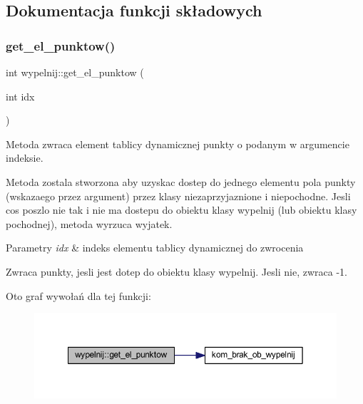 \subsection{Dokumentacja funkcji składowych}
\mbox{\label{classwypelnij_aa30d2e93f672e9f4b35c842f52040019}} 
\subsubsection{\texorpdfstring{get\+\_\+el\+\_\+punktow()}{get\_el\_punktow()}}
{\footnotesize\ttfamily int wypelnij\+::get\+\_\+el\+\_\+punktow (\begin{DoxyParamCaption}\item[{int}]{idx }\end{DoxyParamCaption})}

Metoda zwraca element tablicy dynamicznej punkty o podanym w argumencie indeksie.

Metoda zostala stworzona aby uzyskac dostep do jednego elementu pola punkty (wskazaego przez argument) przez klasy niezaprzyjaznione i niepochodne. Jesli cos poszlo nie tak i nie ma dostepu do obiektu klasy wypelnij (lub obiektu klasy pochodnej), metoda wyrzuca wyjatek. 
\begin{DoxyParams}{Parametry}
{\em idx} & indeks elementu tablicy dynamicznej do zwrocenia \\
\hline
\end{DoxyParams}
\begin{DoxyReturn}{Zwraca}
punkty, jesli jest dotep do obiektu klasy wypelnij. Jesli nie, zwraca -\/1. 
\end{DoxyReturn}
Oto graf wywołań dla tej funkcji\+:
\nopagebreak
\begin{figure}[H]
\begin{center}
\leavevmode
\includegraphics[width=350pt]{classwypelnij_aa30d2e93f672e9f4b35c842f52040019_cgraph}
\end{center}
\end{figure}
\mbox{\label{classwypelnij_a5fb16bb1a4571f9c45c665bf3eac1089}} 
